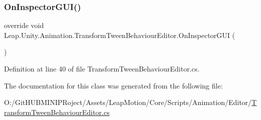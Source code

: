 \subsubsection{\texorpdfstring{OnInspectorGUI()}{OnInspectorGUI()}}
{\footnotesize\ttfamily override void Leap.\+Unity.\+Animation.\+Transform\+Tween\+Behaviour\+Editor.\+On\+Inspector\+G\+UI (\begin{DoxyParamCaption}{ }\end{DoxyParamCaption})}



Definition at line 40 of file Transform\+Tween\+Behaviour\+Editor.\+cs.



The documentation for this class was generated from the following file\+:\begin{DoxyCompactItemize}
\item 
O\+:/\+Git\+H\+U\+B\+M\+I\+N\+I\+P\+Roject/\+Assets/\+Leap\+Motion/\+Core/\+Scripts/\+Animation/\+Editor/\mbox{\hyperlink{_transform_tween_behaviour_editor_8cs}{Transform\+Tween\+Behaviour\+Editor.\+cs}}\end{DoxyCompactItemize}
